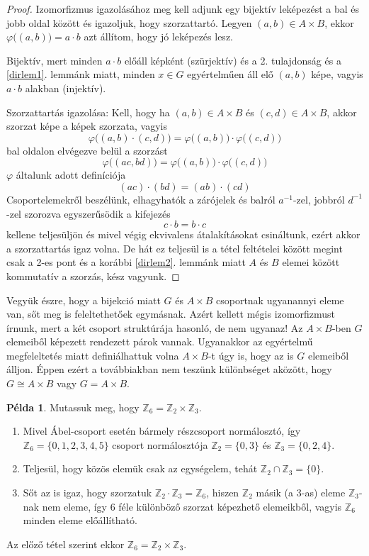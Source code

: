 \documentclass[12pt]{book}
\theoremstyle{plain} %
\theoremstyle{definition} %
\newtheorem{pl}{Példa}[section]
\theoremstyle{remark}
\numberwithin{equation}{section}  %
\def\Z{\mathbb{Z}}
\begin{document}
	\begin{proof}
		Izomorfizmus igazolásához meg kell adjunk egy bijektív leképezést a bal és jobb oldal között és igazoljuk, hogy szorzattartó. Legyen $(a,b)\in A\times B$, ekkor $\varphi\big((a,b)\big) =a\cdot b$ azt állítom, hogy jó leképezés lesz.
		
		Bijektív, mert minden $a\cdot b$ előáll képként (szürjektív) és a 2. tulajdonság és a \ref{dirlem1}. lemmánk miatt, minden $x\in G$ egyértelműen áll elő $(a,b)$ képe, vagyis $a\cdot b$ alakban (injektív).
		
		Szorzattartás igazolása: Kell, hogy ha $(a,b)\in A\times B$ és $(c,d)\in A\times B$, akkor szorzat képe a képek szorzata, vagyis
		\[ \varphi\big((a,b)\cdot (c,d)\big) = \varphi\big((a,b)\big) \cdot \varphi\big((c,d)\big)  \]
		bal oldalon elvégezve belül a szorzást
		\[ \varphi\big((ac,bd)\big) =\varphi\big((a,b)\big) \cdot \varphi\big((c,d)\big)  \]
		$\varphi$ általunk adott definíciója
		\[ (ac)\cdot (bd) = (ab)\cdot (cd) \]
		Csoportelemekről beszélünk, elhagyhatók a zárójelek és balról $a^{-1}$-zel, jobbról $d^{-1}$-zel szorozva egyszerűsödik a kifejezés
		\[ c\cdot b = b \cdot c  \]
		kellene teljesüljön és mivel végig ekvivalens átalakításokat csináltunk, ezért akkor a szorzattartás igaz volna. De hát ez teljesül is a tétel feltételei között megint csak a 2-es pont és a korábbi \ref{dirlem2}. lemmánk miatt $A$ és $B$ elemei között kommutatív a szorzás, kész vagyunk.
	\end{proof}

	Vegyük észre, hogy a bijekció miatt $G$ és $A\times B$ csoportnak ugyanannyi eleme van, sőt meg is feleltethetőek egymásnak. Azért kellett mégis izomorfizmust írnunk, mert a két csoport struktúrája hasonló, de nem ugyanaz! Az $A\times B$-ben $G$ elemeiből képezett rendezett párok vannak. Ugyanakkor az egyértelmű megfeleltetés miatt definiálhattuk volna $A\times B$-t úgy is, hogy az is $G$ elemeiből álljon. Éppen ezért a továbbiakban nem teszünk különbséget aközött, hogy $G\cong A\times B$ vagy $G = A\times B$.
	
	\begin{pl}
		Mutassuk meg, hogy $\Z_6=\Z_2\times \Z_3$.
		
		\begin{enumerate}
			\item Mivel Ábel-csoport esetén bármely részcsoport normálosztó, így $\Z_6 = \{0,1,2,3,4,5\}$ csoport normálosztója $\Z_2=\{0,3\}$ és $\Z_3=\{0, 2, 4\}$.
			
			\item Teljesül, hogy közös elemük csak az egységelem, tehát $\Z_2\cap \Z_3 = \{0\}$.
			
			\item Sőt az is igaz, hogy szorzatuk $\Z_2 \cdot \Z_3 = \Z_6$, hiszen $\Z_2$ másik (a $3$-as) eleme $\Z_3$-nak nem eleme, így $6$ féle különböző szorzat képezhető elemeikből, vagyis $\Z_6$ minden eleme előállítható.
		\end{enumerate}
	
		Az előző tétel szerint ekkor $\Z_6 = \Z_2 \times \Z_3$.
	\end{pl}
	
\end{document}
